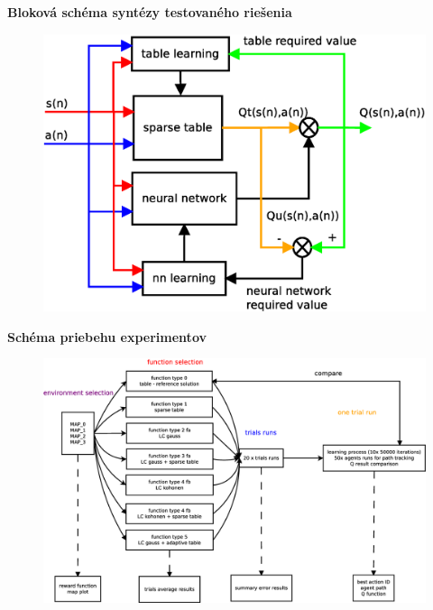 \documentclass[xcolor=dvipsnames]{beamer}
\begin{document}
\begin{frame}{\bf Bloková schéma syntézy testovaného riešenia}

\begin{figure}[!htb]
\centering
\includegraphics[scale=.4]{../diagrams/q_learning_hybrid.eps}
\end{figure}

\end{frame}

\begin{frame}{\bf Schéma priebehu experimentov}

\begin{figure}[!htb]
\centering
\includegraphics[scale=.22]{../diagrams/experiment_map_q_learning.eps}
\end{figure}

\end{frame}
\end{document}
